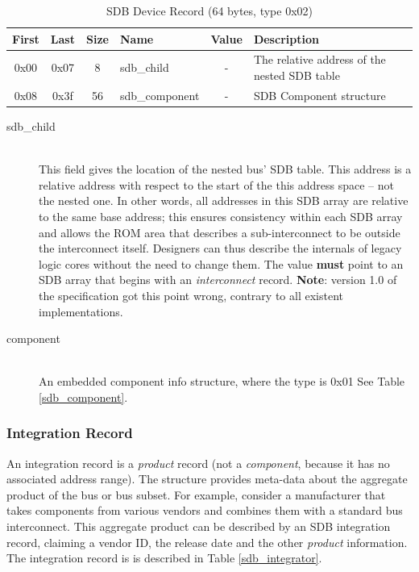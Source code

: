 \documentclass[a4paper, 12pt]{article}
\begin{document}
\begin{center}
  \begin{savenotes}
    \begin{table}[!ht]\footnotesize
      \caption{SDB Device Record (64 bytes, type 0x02)}\label{sdb_bridge}\centering
        \begin{tabular}{| c | c | c | l | c | p{5cm} |} \hline
        First & Last & Size & Name & Value & Description \\ \hline
        0x00 & 0x07 & 8 & sdb\_child & - & The relative address of the nested SDB table \\ \hline
        0x08 & 0x3f & 56 & sdb\_component & - & SDB Component structure \\ \hline
        \end{tabular}
    \end{table}
  \end{savenotes}
\end{center}

\begin{description}
\item[sdb\_child] \hfill \\
This field gives the location of the nested bus' SDB table. This address is a relative address
with respect to the start of the this address space -- not the nested one. In other words,
all addresses in this SDB array are relative to the same base address; this ensures consistency
within each SDB array and allows the ROM area that describes a sub-interconnect to be
outside the interconnect itself.  Designers can thus describe the internals of legacy logic
cores without the need to change them.
The value \textbf{must} point to an SDB array that begins with an \textit{interconnect} record.
\textbf{Note}: version 1.0 of the specification
got this point wrong, contrary to all existent implementations.

\item[component] \hfill \\
An embedded component info structure, where the type is 0x01 See Table \ref{sdb_component}.
\end{description}

\pagebreak 

\subsubsection{Integration Record}

An integration record is a \textit{product} record (not a \textit{component}, because
it has no associated address range).
The structure provides meta-data about the aggregate product of the bus or bus subset.
For example, consider
a manufacturer that takes components from various vendors and combines them with a standard bus
interconnect. This aggregate product can be described by an SDB integration record, claiming
a vendor ID, the release date and the other \textit{product} information.
The integration record is is described in Table \ref{sdb_integrator}.
\end{document}
